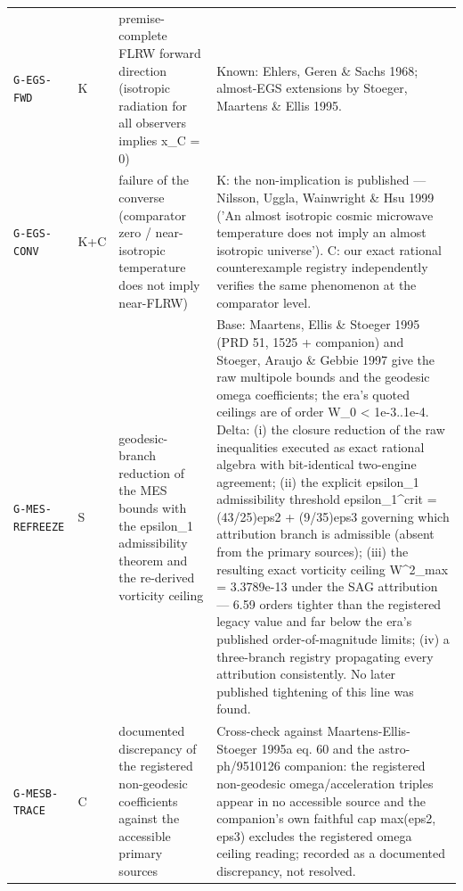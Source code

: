 \documentclass[10pt]{article}
\theoremstyle{definition}
\newcommand{\code}[1]{\texttt{\small #1}}
\begin{document}
\begin{center}
\begin{longtable}{p{2.0cm} p{0.7cm} p{5.4cm} p{6.5cm}}
\code{G-EGS-FWD} & K & premise-complete FLRW forward direction (isotropic radiation for all observers implies x\_C = 0) & Known: Ehlers, Geren \& Sachs 1968; almost-EGS extensions by Stoeger, Maartens \& Ellis 1995. \\[2pt]
\code{G-EGS-CONV} & K+C & failure of the converse (comparator zero / near-isotropic temperature does not imply near-FLRW) & K: the non-implication is published — Nilsson, Uggla, Wainwright \& Hsu 1999 ('An almost isotropic cosmic microwave temperature does not imply an almost isotropic universe'). C: our exact rational counterexample registry independently verifies the same phenomenon at the comparator level. \\[2pt]
\code{G-MES-REFREEZE} & S & geodesic-branch reduction of the MES bounds with the epsilon\_1 admissibility theorem and the re-derived vorticity ceiling & Base: Maartens, Ellis \& Stoeger 1995 (PRD 51, 1525 + companion) and Stoeger, Araujo \& Gebbie 1997 give the raw multipole bounds and the geodesic omega coefficients; the era's quoted ceilings are of order W\_0 < 1e-3..1e-4. Delta: (i) the closure reduction of the raw inequalities executed as exact rational algebra with bit-identical two-engine agreement; (ii) the explicit epsilon\_1 admissibility threshold epsilon\_1\^{}crit = (43/25)eps2 + (9/35)eps3 governing which attribution branch is admissible (absent from the primary sources); (iii) the resulting exact vorticity ceiling W\^{}2\_max = 3.3789e-13 under the SAG attribution — 6.59 orders tighter than the registered legacy value and far below the era's published order-of-magnitude limits; (iv) a three-branch registry propagating every attribution consistently. No later published tightening of this line was found. \\[2pt]
\code{G-MESB-TRACE} & C & documented discrepancy of the registered non-geodesic coefficients against the accessible primary sources & Cross-check against Maartens-Ellis-Stoeger 1995a eq. 60 and the astro-ph/9510126 companion: the registered non-geodesic omega/acceleration triples appear in no accessible source and the companion's own faithful cap max(eps2, eps3) excludes the registered omega ceiling reading; recorded as a documented discrepancy, not resolved. \\[2pt]

\end{longtable}
\end{center}
\end{document}
